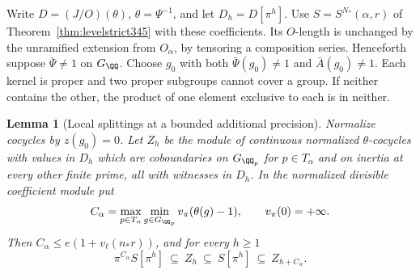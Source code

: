 \documentclass[a4paper,11pt]{article}
\newtheorem{lemma}[proposition]{Lemma}
\theoremstyle{definition}
\theoremstyle{remark}
\numberwithin{equation}{section}
\begin{document}
Write \(D=(J/O)(\theta)\), \(\theta=\Psi^{-1}\), and let
\(D_h=D[\pi^h]\). Use \(S=S^{N_*}(\alpha,r)\) of
Theorem~\ref{thm:levelstrict345} with these coefficients.
Its \(O\)-length is unchanged by the unramified extension
from \(O_\alpha\), by tensoring a composition series. Henceforth
suppose \(\bar\Psi\ne1\) on \(G_\QQ\). Choose \(g_0\) with
both \(\bar\Psi(g_0)\ne1\) and \(\bar A(g_0)\ne1\). Each
kernel is proper and two proper subgroups cannot cover a
group. If neither contains the other, the product of one
element exclusive to each is in neither.

\begin{lemma}[Local splittings at a bounded additional precision]\leavevmode
\label{lem:polarizedwitness429}
Normalize cocycles by \(z(g_0)=0\). Let \(Z_h\) be the
module of continuous normalized \(\theta\)-cocycles with
values in \(D_h\) which are coboundaries on \(G_{\QQ_p}\)
for \(p\in T_\alpha\) and on inertia at every other finite
prime, all with witnesses in \(D_h\). In the normalized
divisible coefficient module put
\[
 C_\alpha=\max_{p\in T_\alpha}\min_{g\in G_{\QQ_p}}
                     v_\pi(\theta(g)-1),\qquad v_\pi(0)=+\infty .
\]
Then \(C_\alpha\le e(1+v_\ell(n_*r))\), and for every \(h\ge1\)
\[
       \pi^{C_\alpha} S[\pi^h]\ \subseteq\ Z_h\
              \subseteq\ S[\pi^h]\ \subseteq\ Z_{h+C_\alpha}.
\]
\end{lemma}
\end{document}
